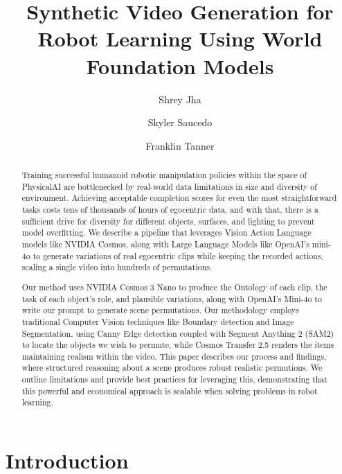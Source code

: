 \documentclass[runningheads]{llncs}
\begin{document}
\title{Synthetic Video Generation for Robot Learning Using World Foundation Models}

\author{Shrey Jha \and Skyler Saucedo \and Franklin Tanner}


\maketitle

\begin{abstract}
Training successful humanoid robotic manipulation policies within the space of PhysicalAI are bottlenecked by real-world data limitations in size and diversity of environment. Achieving acceptable completion scores for even the most straightforward tasks costs tens of thousands of hours of egocentric data, and with that, there is a sufficient drive for diversity for different objects, surfaces, and lighting to prevent model overfitting. We describe a pipeline that leverages Vision Action Language models like NVIDIA Cosmos, along with Large Language Models like OpenAI's mini-4o to generate variations of real egocentric clips while keeping the recorded actions, scaling a single video into hundreds of permutations.

Our method uses NVIDIA Cosmos 3 Nano to produce the Ontology of each clip, the task of each object's role, and plausible variations, along with OpenAI's Mini-4o to write our prompt to generate scene permutations. Our methodology employs traditional Computer Vision techniques like Boundary detection and Image Segmentation, using Canny Edge detection coupled with Segment Anything 2 (SAM2) to locate the objects we wish to permute, while Cosmos Transfer 2.5 renders the items maintaining realism within the video. This paper describes our process and findings, where structured reasoning about a scene produces robust realistic permutions. We outline limitations and provide best practices for leveraging this, demonstrating that this powerful and economical approach is scalable when solving problems in robot learning.
\end{abstract}

\section{Introduction}
\end{document}
